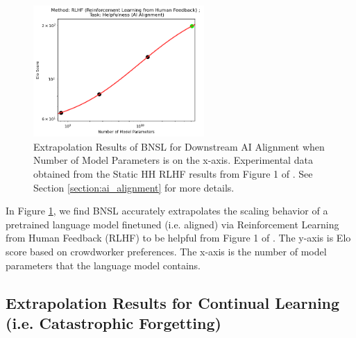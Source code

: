 \documentclass{article} %
\begin{document}
\begin{figure}[htbp]
    \centering
\includegraphics[width=0.58\textwidth]{figures/ai_alignment/log-log.png}





    \caption{
Extrapolation Results of BNSL for Downstream AI Alignment when Number of Model Parameters is on the x-axis. Experimental data obtained from the Static HH RLHF results from Figure 1 of \cite{bai2022training}. See Section \ref{section:ai_alignment} for more details.
    }
    \label{fig:ai_alignment}
\end{figure}

In Figure \ref{fig:ai_alignment}, we find BNSL accurately extrapolates the scaling behavior of a pretrained language model finetuned (i.e. aligned) via Reinforcement Learning from Human Feedback (RLHF) to be helpful from Figure 1 of \cite{bai2022training}. The y-axis is Elo score based on crowdworker preferences. The x-axis is the number of model parameters that the language model contains.

\vspace{5.0mm}

\subsection{Extrapolation Results for Continual Learning (i.e. Catastrophic Forgetting)}
\label{section:continual}
\end{document}

